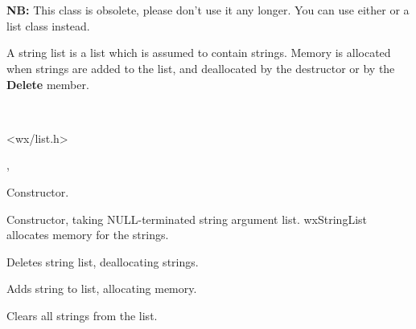 \section{}\label{wxstringlist}

{\bf NB:} This class is obsolete, please don't use it any longer. You can use
either  or a  
list class instead.

A string list is a list which is assumed to contain strings.
Memory is allocated when strings are added to
the list, and deallocated by the destructor or by the {\bf Delete}\rtfsp
member.


\\


<wx/list.h>


, 


\label{wxstringlistctor}


Constructor.


Constructor, taking NULL-terminated string argument list. wxStringList
allocates memory for the strings.

\label{wxstringlistdtor}


Deletes string list, deallocating strings.

\label{wxstringlistadd}


Adds string to list, allocating memory.

\label{wxstringlistclear}


Clears all strings from the list.

\label{wxstringlistdelete}

